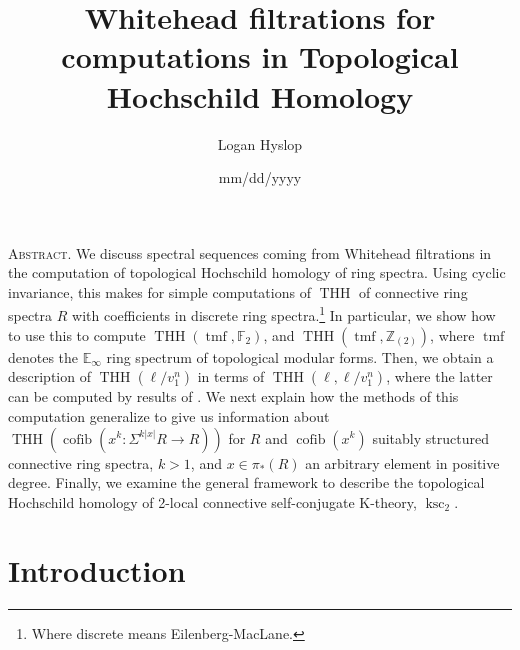 \documentclass[11pt,leqno]{article}
\title{
	Whitehead filtrations for computations in Topological Hochschild Homology
}
\author{ Logan Hyslop }
\date{mm/dd/yyyy}
\newcommand{\zz}{\mathbb{Z}}
\newcommand{\bb}[1]{\mathbb{#1}}
\newcommand{\fff}{\mathbb{F}}
\DeclareMathOperator{\THH}{THH}
\DeclareMathOperator{\tmf}{tmf}
\DeclareMathOperator{\ksc}{ksc}
\newcommand{\mo}[1]{\operatorname{#1}}
\newtheorem*{short hand}{theorem name}
\theoremstyle{plain}  %
\theoremstyle{definition}
\numberwithin{equation}{section}
\renewcommand{\maketitle}{%
	\begin{center}
		{\linespread{1.15}%
			\bfseries\MakeTextUppercase%
			\thetitle\par} \vspace{4.0ex}
		\footnotesize
		{\MakeUppercase \theauthor}
	\end{center}
	\vspace{3.0ex}
	\thispagestyle{fancy}
}
\renewenvironment{abstract}{\noindent\begin{center}\begin{minipage}{0.8\linewidth}\small{\scshape Abstract.}}{\end{minipage}\end{center}}
\begin{document}
		\DeclareDocumentCommand{}
\DeclareDocumentCommand{}
\DeclareDocumentCommand{}
\DeclareDocumentCommand{}
	

	
\maketitle
	
	
	
	
	
	
	
	\begin{abstract}
	We discuss spectral sequences coming from Whitehead filtrations in the computation of topological Hochschild homology of ring spectra.  Using cyclic invariance, this makes for simple computations of $\THH$ of connective ring spectra $R$ with coefficients in discrete ring spectra.\footnote{Where discrete means Eilenberg-MacLane.}  In particular, we show how to use this to compute $\THH(\tmf,\fff_2)$, and $\THH(\tmf,\zz_{(2)})$, where $\tmf$ denotes the $\bb{E}_\infty$ ring spectrum of topological modular forms.  Then, we obtain a description of $\THH(\ell/v_1^n)$ in terms of $\THH(\ell,\ell/v_1^n)$, where the latter can be computed by results of \cite{angeltveit2009topological}.  We next explain how the methods of this computation generalize to give us information about $\THH(\mo{cofib}(x^k:\Sigma^{k|x|}R\to R))$ for $R$ and $\mo{cofib}(x^k)$ suitably structured connective ring spectra, $k>1$, and $x\in \pi_{*}(R)$ an arbitrary element in positive degree.  Finally, we examine the general framework to describe the topological Hochschild homology of 2-local connective self-conjugate K-theory, $\ksc_2$.
	\end{abstract}
{\small
	\setcounter{tocdepth}{1}
	\tableofcontents
	\vspace{3.0ex}
}
	\section{Introduction}
		\setcounter{section}{1}
\end{document}

